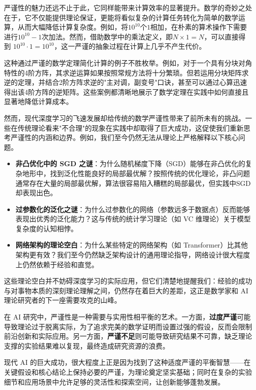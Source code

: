 严谨性的魅力还远不止于此，它同样能带来计算效率的显著提升。数学的奇妙之处在于，它不仅能提供理论保证，更能将看似复杂的计算任务转化为简单的数学运算，从而大幅降低计算复杂度。例如，将$10^{10}$个$1$相加，在朴素的算术操作下需要进行$10^{10}-1$次加法。然而，借助数学中的乘法定义，即$N \times 1 = N$，可以直接得到 $10^{10} \cdot 1 = 10^{10}$，这一严谨的抽象过程在计算上几乎不产生代价。

这种通过严谨的数学定理简化计算的例子不胜枚举。例如，对于一个具有分块对角特性的4阶方阵，其求逆运算如果按照常规方法将十分繁琐。但若运用分块矩阵求逆的定理，并结合2阶方阵求逆的"主对调，副变号"口诀，甚至可以通过心算迅速得出该4阶方阵的逆矩阵。这些案例都清晰地展示了数学定理在实践中如何直接且显著地降低计算成本。

然而，现代深度学习的飞速发展却给传统的数学严谨性带来了前所未有的挑战。一些在传统理论看来"不合理"的现象在实践中却取得了巨大成功，这促使我们重新思考严谨性的内涵和边界。例如，我们至今仍然无法从理论上严格解释以下核心问题。

\begin{itemize}
\item \textbf{非凸优化中的 SGD 之谜}：为什么随机梯度下降（SGD）能够在非凸优化的复杂地形中，找到泛化性能良好的局部最优解？按照传统的优化理论，非凸问题通常存在大量的局部最优解，算法很容易陷入糟糕的局部最优，但实践中SGD却表现出色。

\item  \textbf{过参数化的泛化之谜}：为什么过参数化的网络（参数远多于数据点）反而能够表现出优秀的泛化能力？这与传统的统计学习理论（如 VC 维理论）关于模型复杂度的认知相悖。
 
\item \textbf{网络架构的理论空白}：为什么某些特定的网络架构（如 Transformer）比其他架构更有效？我们至今仍然缺乏架构设计的通用理论指导，网络设计很大程度上仍然依赖于经验和直觉。
\end{itemize}

这些理论空白并不妨碍深度学习的实际应用，但它们清楚地提醒我们：经验的成功与对事物本质的深刻理论理解之间，仍然存在着巨大的差距，这正是数学家和 AI 理论研究者的下一座需要攻克的山峰。

在 AI 研究中，严谨性是一种需要与实用性相平衡的艺术。一方面，\textbf{过度严谨}可能导致理论过于脱离实际，为了追求完美的数学证明而设置过强的假设，反而会限制前沿创新和实际应用。另一方面，\textbf{严谨不足}则可能导致研究结果不可靠，缺乏理论支撑的实验结果难以复现，最终造成研究资源的浪费。

现代 AI 的巨大成功，很大程度上正是因为找到了这种适度严谨的平衡智慧——在关键假设和核心结论上保持必要的严谨，为理论奠定坚实基础；同时在复杂的实验细节和应用场景中允许足够的灵活性和探索空间，让创新能够蓬勃发展。

